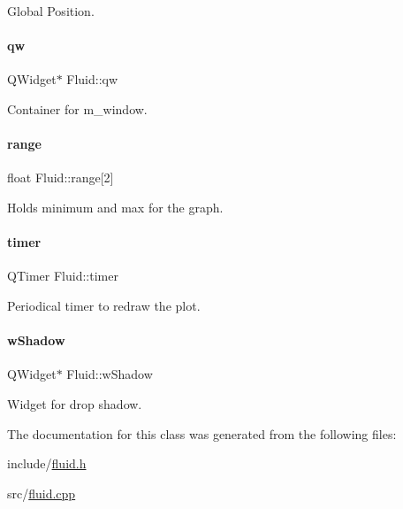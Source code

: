Global Position. 

\mbox{\label{classFluid_a38ced692400072201566af41fd8fe5cd}} 
\paragraph{\texorpdfstring{qw}{qw}}
{\footnotesize\ttfamily Q\+Widget$\ast$ Fluid\+::qw\hspace{0.3cm}{\ttfamily [private]}}



Container for m\+\_\+window. 

\mbox{\label{classFluid_a68eb81a3476d8aef975f151e209fe317}} 
\paragraph{\texorpdfstring{range}{range}}
{\footnotesize\ttfamily float Fluid\+::range\mbox{[}2\mbox{]}\hspace{0.3cm}{\ttfamily [private]}}



Holds minimum and max for the graph. 

\mbox{\label{classFluid_a0765840a82e6ec401dea0cb65c435f5f}} 
\paragraph{\texorpdfstring{timer}{timer}}
{\footnotesize\ttfamily Q\+Timer Fluid\+::timer\hspace{0.3cm}{\ttfamily [private]}}



Periodical timer to redraw the plot. 

\mbox{\label{classFluid_a55892004855abbf3458402a674add0e4}} 
\paragraph{\texorpdfstring{wShadow}{wShadow}}
{\footnotesize\ttfamily Q\+Widget$\ast$ Fluid\+::w\+Shadow\hspace{0.3cm}{\ttfamily [private]}}



Widget for drop shadow. 



The documentation for this class was generated from the following files\+:\begin{DoxyCompactItemize}
\item 
include/\mbox{\hyperlink{fluid_8h}{fluid.\+h}}\item 
src/\mbox{\hyperlink{fluid_8cpp}{fluid.\+cpp}}\end{DoxyCompactItemize}
